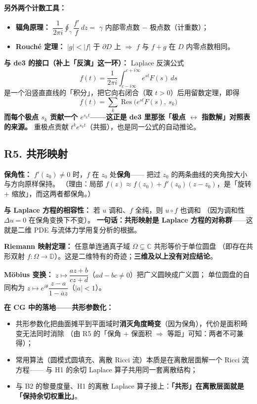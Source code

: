 \textbf{另外两个计数工具：}
\begin{itemize}
  \item \textbf{辐角原理：} $\dfrac{1}{2\pi i}\oint_\gamma\dfrac{f'}{f}\,dz=$ $\gamma$ 内部零点数 $-$ 极点数（计重数）；
  \item \textbf{Rouché 定理：} $|g|<|f|$ 于 $\partial D$ 上 $\Longrightarrow$ $f$ 与 $f+g$ 在 $D$ 内零点数相同。
\end{itemize}

\textbf{与 de3 的接口（补上「反演」这一环）：} Laplace 反演公式
\[
f(t)=\frac{1}{2\pi i}\int_{c-i\infty}^{c+i\infty}e^{st}F(s)\,ds
\]
是一个沿竖直直线的「积分」，把它向右闭合（取 $t>0$）后用留数定理，即得
\[
f(t)=\sum_k \operatorname{Res}\big(e^{st}F(s),\ s_k\big)
\]
\textbf{而每个极点 $s_k$ 贡献一个 $e^{s_k t}$——这正是 de3 里那张「极点 $\leftrightarrow$ 指数解」对照表的来源。}
重极点贡献 $t^ke^{s_kt}$（共振），也是同一公式的自动推论。

\subsection{R5. 共形映射}

\textbf{保角性：} $f'(z_0)\ne0$ 时，$f$ 在 $z_0$ 处\textbf{保角}——
把过 $z_0$ 的两条曲线的夹角按大小与方向原样保持。
（理由：局部 $f(z)\approx f(z_0)+f'(z_0)(z-z_0)$，是「旋转 $+$ 缩放」，而这两者都保角。）

\textbf{与 Laplace 方程的相容性：} 若 $u$ 调和、$f$ 全纯，则 $u\circ f$ 也调和
（因为调和性 $\Delta u=0$ 在保角变换下不变）。
\textbf{一句话：共形映射是 Laplace 方程的对称群}——这就是二维 PDE 与流体力学用复分析的根据。

\textbf{Riemann 映射定理：} 任意单连通真子域 $\Omega\subsetneq\mathbb C$ 共形等价于单位圆盘
（即存在共形双射 $f:\Omega\to\mathbb D$）。这是二维特有的奇迹；\textbf{三维及以上没有对应结论}。

\textbf{Möbius 变换：} $z\mapsto\dfrac{az+b}{cz+d}$（$ad-bc\ne0$）把广义圆映成广义圆；
单位圆盘的自同构为 $z\mapsto e^{i\theta}\dfrac{z-a}{1-\bar a z}$（$|a|<1$）。

\textbf{在 CG 中的落地——共形参数化：}
\begin{itemize}
  \item 共形参数化把曲面摊平到平面域时\textbf{消灭角度畸变}（因为保角），代价是面积畸变无法同时消除
        （由 R5 的「保角 $+$ 保面积 $\Rightarrow$ 等距」可知：两者不可兼得）；
  \item 常用算法（圆模式圆填充、离散 Ricci 流）本质是在离散层面解一个 Ricci 流方程——
        与 H1 的余切 Laplace 算子共用同一套离散结构；
  \item 与 B2 的黎曼度量、H1 的离散 Laplace 算子接上：\textbf{「共形」在离散层面就是「保持余切权重比」}。
\end{itemize}

